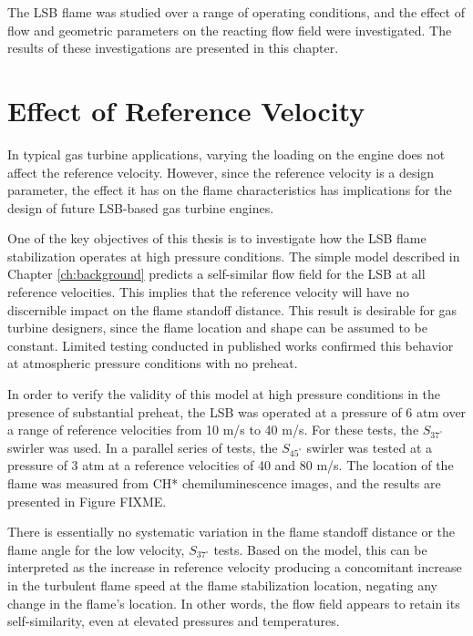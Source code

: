 The LSB flame was studied over a range of operating conditions, and the effect of flow and geometric parameters on the reacting flow field were investigated.
The results of these investigations are presented in this chapter.


\section{Effect of Reference Velocity}
\label{sec:lsb-effect-of-reference-velocity}

In typical gas turbine applications, varying the loading on the engine does not affect the reference velocity.
However, since the reference velocity is a design parameter, the effect it has on the flame characteristics has implications for the design of future LSB-based gas turbine engines.

One of the key objectives of this thesis is to investigate how the LSB flame stabilization operates at high pressure conditions.
The simple model described in Chapter \ref{ch:background} predicts a self-similar flow field for the LSB at all reference velocities.
This implies that the reference velocity will have no discernible impact on the flame standoff distance.
This result is desirable for gas turbine designers, since the flame location and shape can be assumed to be constant.
Limited testing conducted in published works confirmed this behavior at atmospheric pressure conditions with no preheat.

In order to verify the validity of this model at high pressure conditions in the presence of substantial preheat, the LSB was operated at a pressure of 6 atm over a range of reference velocities from 10 m/s to 40 m/s. For these tests, the \(S_{37^\circ}\) swirler was used.
In a parallel series of tests, the \(S_{45^\circ}\) swirler was tested at a pressure of 3 atm at a reference velocities of 40 and 80 m/s.
The location of the flame was measured from CH* chemiluminescence images, and the results are presented in Figure FIXME.

There is essentially no systematic variation in the flame standoff distance or the flame angle for the low velocity, \(S_{37^\circ}\) tests.
Based on the model, this can be interpreted as the increase in reference velocity producing a concomitant increase in the turbulent flame speed at the flame stabilization location, negating any change in the flame's location.
In other words, the flow field appears to retain its self-similarity, even at elevated pressures and temperatures.

